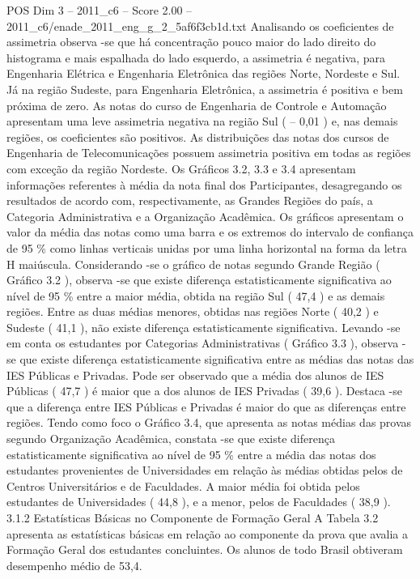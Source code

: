 \begin{textsample}{POS Dim 3 – 2011\_c6 – Score 2.00 – 2011\_c6/enade\_2011\_eng\_g\_2\_5af6f3cb1d.txt}
Analisando os coeficientes de assimetria observa -se que há concentração pouco maior do lado direito do histograma e mais espalhada do lado esquerdo, a assimetria é negativa, para Engenharia Elétrica e Engenharia Eletrônica das regiões Norte, Nordeste e Sul.
Já na região Sudeste, para Engenharia Eletrônica, a assimetria é positiva e bem próxima de zero.
As notas do curso de Engenharia de Controle e Automação apresentam uma leve assimetria negativa na região Sul ( – 0,01 ) e, nas demais regiões, os coeficientes são positivos.
As distribuições das notas dos cursos de Engenharia de Telecomunicações possuem assimetria positiva em todas as regiões com exceção da região Nordeste.
Os Gráficos 3.2, 3.3 e 3.4 apresentam informações referentes à média da nota final dos Participantes, desagregando os resultados de acordo com, respectivamente, as Grandes Regiões do país, a Categoria Administrativa e a Organização Acadêmica.
Os gráficos apresentam o valor da média das notas como uma barra e os extremos do intervalo de confiança de 95 \% como linhas verticais unidas por uma linha horizontal na forma da letra H maiúscula.
Considerando -se o gráfico de notas segundo Grande Região ( Gráfico 3.2 ), observa -se que existe diferença estatisticamente significativa ao nível de 95 \% entre a maior média, obtida na região Sul ( 47,4 ) e as demais regiões.
Entre as duas médias menores, obtidas nas regiões Norte ( 40,2 ) e Sudeste ( 41,1 ), não existe diferença estatisticamente significativa.
Levando -se em conta os estudantes por Categorias Administrativas ( Gráfico 3.3 ), observa -se que existe diferença estatisticamente significativa entre as médias das notas das IES Públicas e Privadas.
Pode ser observado que a média dos alunos de IES Públicas ( 47,7 ) é maior que a dos alunos de IES Privadas ( 39,6 ).
Destaca -se que a diferença entre IES Públicas e Privadas é maior do que as diferenças entre regiões.
Tendo como foco o Gráfico 3.4, que apresenta as notas médias das provas segundo Organização Acadêmica, constata -se que existe diferença estatisticamente significativa ao nível de 95 \% entre a média das notas dos estudantes provenientes de Universidades em relação às médias obtidas pelos de Centros Universitários e de Faculdades.
A maior média foi obtida pelos estudantes de Universidades ( 44,8 ), e a menor, pelos de Faculdades ( 38,9 ). 3.1.2 Estatísticas Básicas no Componente de Formação Geral A Tabela 3.2 apresenta as estatísticas básicas em relação ao componente da prova que avalia a Formação Geral dos estudantes concluintes.
Os alunos de todo Brasil obtiveram desempenho médio de 53,4.

\end{textsample}
